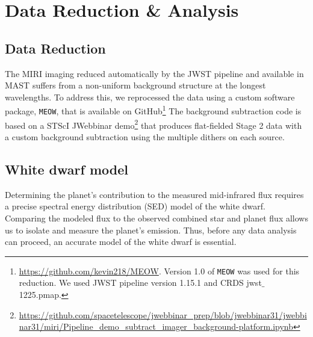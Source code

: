 \documentclass[twocolumn]{aastex631}
\begin{document}
\section{Data Reduction \& Analysis}\label{DataRed}

\subsection{Data Reduction}\label{reduce}

The MIRI imaging reduced automatically by the JWST pipeline and available in MAST suffers from a non-uniform background structure at the longest wavelengths. To address this, we reprocessed the data using a custom software package, \texttt{MEOW}, that is available on GitHub\footnote{\url{https://github.com/kevin218/MEOW}. Version 1.0 of \texttt{MEOW} was used for this reduction.  We used JWST pipeline version 1.15.1 and CRDS jwst$\_$1225.pmap.} The background subtraction code is based on a STScI JWebbinar demo\footnote{\url{https://github.com/spacetelescope/jwebbinar_prep/blob/jwebbinar31/jwebbinar31/miri/Pipeline_demo_subtract_imager_background-platform.ipynb}} that produces flat-fielded Stage 2 data with a custom background subtraction using the multiple dithers on each source. 



\subsection{White dwarf model}\label{WDmodel}


Determining the planet's contribution to the measured mid-infrared flux requires a precise spectral energy distribution (SED) model of the white dwarf. Comparing the modeled flux to the observed combined star and planet flux allows us to isolate and measure the planet's emission. Thus, before any data analysis can proceed, an accurate model of the white dwarf is essential.  
\end{document}
